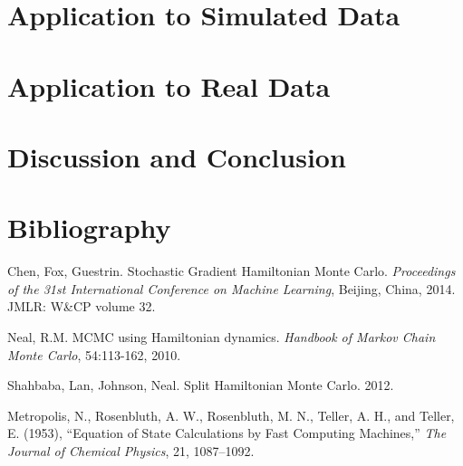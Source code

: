 \documentclass[12pt]{article}
\begin{document}
\section{Application to Simulated Data}


\section{Application to Real Data}


%

\section{Discussion and Conclusion}


\section{Bibliography}

\begin{thebibliography}{9}
	Chen, Fox, Guestrin. Stochastic Gradient Hamiltonian Monte Carlo. \textit{Proceedings of the 31st International Conference on Machine Learning}, Beijing, China, 2014. JMLR: W\&CP volume 32.
	
	Neal, R.M. MCMC using Hamiltonian dynamics. \textit{Handbook of Markov Chain Monte Carlo}, 54:113-162, 2010.
	
	Shahbaba, Lan, Johnson, Neal. Split Hamiltonian Monte Carlo. 2012.
	
	Metropolis, N., Rosenbluth, A. W., Rosenbluth, M. N., Teller, A. H., and Teller, E. (1953), ``Equation of State Calculations by Fast Computing Machines,'' \textit{The Journal of Chemical Physics}, 21, 1087–1092.

\end{thebibliography}
\end{document}
